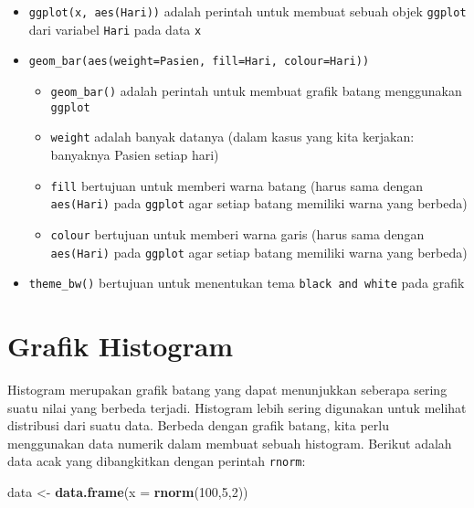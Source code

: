 \documentclass[
]{book}
\newenvironment{Shaded}{\begin{snugshade}}{\end{snugshade}}
\newcommand{\DataTypeTok}[1]{\textcolor[rgb]{0.13,0.29,0.53}{#1}}
\newcommand{\DecValTok}[1]{\textcolor[rgb]{0.00,0.00,0.81}{#1}}
\newcommand{\KeywordTok}[1]{\textcolor[rgb]{0.13,0.29,0.53}{\textbf{#1}}}
\newcommand{\NormalTok}[1]{#1}
\newcommand{\StringTok}[1]{\textcolor[rgb]{0.31,0.60,0.02}{#1}}
\providecommand{\tightlist}{%
  \setlength{\itemsep}{0pt}\setlength{\parskip}{0pt}}
\begin{document}
\begin{itemize}
\tightlist
\item
  \texttt{ggplot(x,\ aes(Hari))} adalah perintah untuk membuat sebuah objek \texttt{ggplot} dari variabel \texttt{Hari} pada data \texttt{x}
\item
  \texttt{geom\_bar(aes(weight=Pasien,\ fill=Hari,\ colour=Hari))}

  \begin{itemize}
  \tightlist
  \item
    \texttt{geom\_bar()} adalah perintah untuk membuat grafik batang menggunakan \texttt{ggplot}
  \item
    \texttt{weight} adalah banyak datanya (dalam kasus yang kita kerjakan: banyaknya Pasien setiap hari)
  \item
    \texttt{fill} bertujuan untuk memberi warna batang (harus sama dengan \texttt{aes(Hari)} pada \texttt{ggplot} agar setiap batang memiliki warna yang berbeda)
  \item
    \texttt{colour} bertujuan untuk memberi warna garis (harus sama dengan \texttt{aes(Hari)} pada \texttt{ggplot} agar setiap batang memiliki warna yang berbeda)
  \end{itemize}
\item
  \texttt{theme\_bw()} bertujuan untuk menentukan tema \texttt{black\ and\ white} pada grafik
\end{itemize}

\hypertarget{grafik-histogram}{%
\section{Grafik Histogram}\label{grafik-histogram}}

Histogram merupakan grafik batang yang dapat menunjukkan seberapa sering suatu nilai yang berbeda terjadi. Histogram lebih sering digunakan untuk melihat distribusi dari suatu data. Berbeda dengan grafik batang, kita perlu menggunakan data numerik dalam membuat sebuah histogram. Berikut adalah data acak yang dibangkitkan dengan perintah \texttt{rnorm}:

\begin{Shaded}
\begin{Highlighting}[]
\NormalTok{data <-}\StringTok{ }\KeywordTok{data.frame}\NormalTok{(}\DataTypeTok{x =} \KeywordTok{rnorm}\NormalTok{(}\DecValTok{100}\NormalTok{,}\DecValTok{5}\NormalTok{,}\DecValTok{2}\NormalTok{))}
\end{Highlighting}
\end{Shaded}
\end{document}
